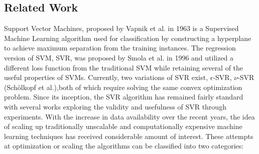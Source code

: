\documentclass[12pt]{article}
\begin{document}
\subsection{Related Work}
Support Vector Machines, proposed by Vapnik et al. in 1963 is a Supervised Machine Learning algorithm used for classification by constructing a hyperplane to achieve maximum separation from the training instances. The regression version of SVM, SVR, was proposed by Smola et al. in 1996 and utilized a different loss function from the traditional SVM while retaining several of the useful properties of SVMs.
\newline\newline
Currently, two variations of SVR exist, $\epsilon$-SVR, $\nu$-SVR (Sch\"olkopf et al.),both of which require solving the same convex optimization problem. 
Since its inception, the SVR algorithm has remained fairly standard with several works exploring the validity and usefulness of SVR through experiments.
\newline\newline
With the increase in data availability over the recent years, the idea of scaling up traditionally unscalable and computationally expensive machine learning techniques has received considerable amount of interest. 
\newline\newline
These attempts at optimization or scaling the algorithms can be classified into two categories:
\end{document}
